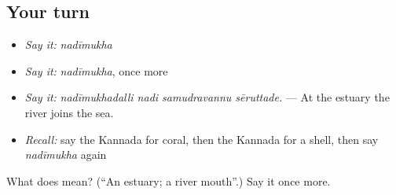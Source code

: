 \subsection*{Your turn}
\begin{itemize}
\raggedright
  \item \emph{Say it:} \emph{nadīmukha}
  \item \emph{Say it:} \emph{nadīmukha}, once more
  \item \emph{Say it:} \emph{nadīmukhadalli nadi samudravannu sēruttade.} — At the estuary the river joins the sea.
  \item \emph{Recall:} say the Kannada for coral, then the Kannada for a shell, then say \emph{nadīmukha} again
\end{itemize}

\begin{tcolorbox}[breakable,colback=teal!4,colframe=teal!35!black,title={Before you move on}]
What does  mean? (\textquotedblleft{}An estuary; a river mouth\textquotedblright{}.) Say it once more.
\end{tcolorbox}
